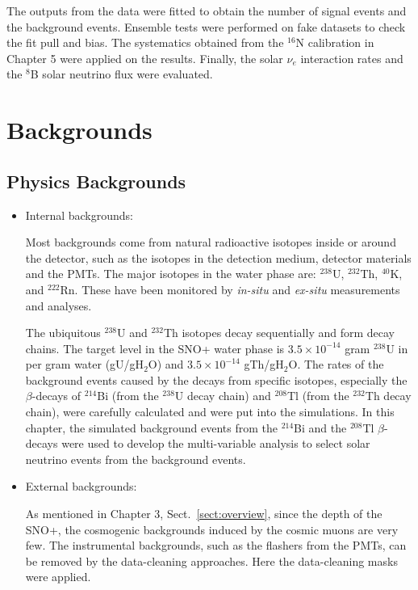 The outputs from the data were fitted to obtain the number of signal events and the background events. Ensemble tests were performed on fake datasets to check the fit pull and bias. The systematics obtained from the $^{16}$N calibration in Chapter 5 were applied on the results. Finally, the solar $\nu_e$ interaction rates and the $^8$B solar neutrino flux were evaluated.


\section{Backgrounds}
\subsection{Physics Backgrounds}

\begin{itemize}
\item Internal backgrounds:

Most backgrounds come from natural radioactive isotopes inside or around the detector, such as the isotopes in the detection medium, detector materials and the PMTs. The major isotopes in the water phase are: $^{238}$U, $^{232}$Th, $^{40}$K, and $^{222}$Rn. These have been monitored by \emph{in-situ} and \emph{ex-situ} measurements and analyses. 

The ubiquitous $^{238}$U and $^{232}$Th isotopes decay sequentially and form decay chains. 
The target level in the SNO+ water phase is $3.5\times 10^{-14}$ gram $^{238}$U in per gram water (gU/gH$_2$O) and $3.5\times 10^{-14}$ gTh/gH$_2$O\cite{waterunidoc}. The rates of the background events caused by the decays from specific isotopes, especially the $\beta$-decays of $^{214}$Bi (from the $^{238}$U decay chain) and $^{208}$Tl (from the $^{232}$Th decay chain), were carefully calculated and were put into the simulations. In this chapter, the simulated background events from the $^{214}$Bi and the $^{208}$Tl $\beta$-decays were used to develop the multi-variable analysis to select solar neutrino events from the background events.

\item External backgrounds:

As mentioned in Chapter 3, Sect.~\ref{sect:overview}, since the depth of the SNO+, the cosmogenic backgrounds induced by the cosmic muons are very few. 
The instrumental backgrounds, such as the flashers from the PMTs, can be removed by the data-cleaning approaches. Here the data-cleaning masks were applied.
\end{itemize}

